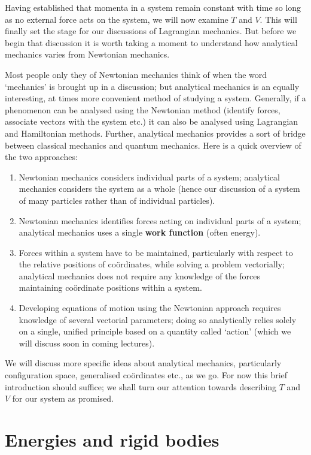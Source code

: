 \documentclass[english,seminar,headertitle]{lecture}
\begin{document}
Having established that momenta in a system remain constant with time so long as no external force acts on the system, we will now examine $T$ and $V$. This will finally set the stage for our discussions of Lagrangian mechanics. But before we begin that discussion it is worth taking a moment to understand how analytical mechanics varies from Newtonian mechanics.

Most people only they of Newtonian mechanics think of when the word `mechanics' is brought up in a discussion; but analytical mechanics is an equally interesting, at times more convenient method of studying a system. Generally, if a phenomenon can be analysed using the Newtonian method (identify forces, associate vectors with the system etc.) it can also be analysed using Lagrangian and Hamiltonian methods. Further, analytical mechanics provides a sort of bridge between classical mechanics and quantum mechanics. Here is a quick overview \cite{lanczos} of the two approaches:
\begin{enumerate}
	\item Newtonian mechanics considers individual parts of a system; analytical mechanics considers the system as a whole (hence our discussion of a system of many particles rather than of individual particles).
	\item Newtonian mechanics identifies forces acting on individual parts of a system; analytical mechanics uses a single \textbf{work function} (often energy).
	\item Forces within a system have to be maintained, particularly with respect to the relative positions of co\"{o}rdinates, while solving a problem vectorially; analytical mechanics does not require any knowledge of the forces maintaining co\"{o}rdinate positions within a system.
	\item Developing equations of motion using the Newtonian approach requires knowledge of several vectorial parameters; doing so analytically relies solely on a single, unified principle based on a quantity called `action' (which we will discuss soon in coming lectures).
\end{enumerate}
We will discuss more specific ideas about analytical mechanics, particularly configuration space, generalised co\"{o}rdinates etc., as we go. For now this brief introduction should suffice; we shall turn our attention towards describing $T$ and $V$ for our system as promised.
%
\section{Energies and rigid bodies}
\end{document}
